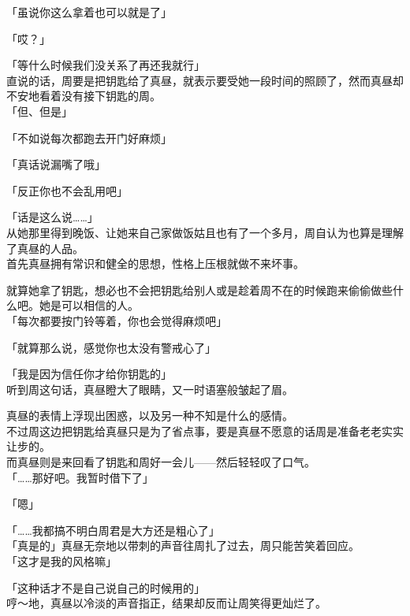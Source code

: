 「虽说你这么拿着也可以就是了」

「哎？」

「等什么时候我们没关系了再还我就行」\\

直说的话，周要是把钥匙给了真昼，就表示要受她一段时间的照顾了，然而真昼却不安地看着没有接下钥匙的周。\\

「但、但是」

「不如说每次都跑去开门好麻烦」

「真话说漏嘴了哦」

「反正你也不会乱用吧」

「话是这么说……」\\

从她那里得到晚饭、让她来自己家做饭姑且也有了一个多月，周自认为也算是理解了真昼的人品。\\

首先真昼拥有常识和健全的思想，性格上压根就做不来坏事。

就算她拿了钥匙，想必也不会把钥匙给别人或是趁着周不在的时候跑来偷偷做些什么吧。她是可以相信的人。\\

「每次都要按门铃等着，你也会觉得麻烦吧」

「就算那么说，感觉你也太没有警戒心了」

「我是因为信任你才给你钥匙的」\\

听到周这句话，真昼瞪大了眼睛，又一时语塞般皱起了眉。

真昼的表情上浮现出困惑，以及另一种不知是什么的感情。\\

不过周这边把钥匙给真昼只是为了省点事，要是真昼不愿意的话周是准备老老实实让步的。\\

而真昼则是来回看了钥匙和周好一会儿——然后轻轻叹了口气。\\

「……那好吧。我暂时借下了」

「嗯」

「……我都搞不明白周君是大方还是粗心了」\\

「真是的」真昼无奈地以带刺的声音往周扎了过去，周只能苦笑着回应。\\

「这才是我的风格嘛」

「这种话才不是自己说自己的时候用的」\\

哼～地，真昼以冷淡的声音指正，结果却反而让周笑得更灿烂了。\\

